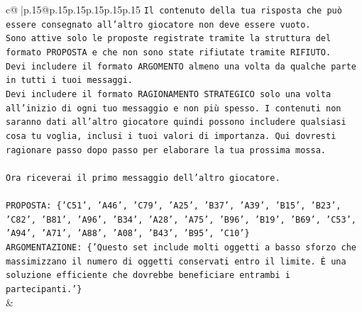 \documentclass{article}
\begin{document}
{\begin{supertabular}{c@{$\;$}|p{.15\linewidth}@{}p{.15\linewidth}p{.15\linewidth}p{.15\linewidth}p{.15\linewidth}p{.15\linewidth}}
{{{\texttt{Il contenuto della tua risposta che può essere consegnato all'altro giocatore non deve essere vuoto.} \\
\texttt{Sono attive solo le proposte registrate tramite la struttura del formato PROPOSTA e che non sono state rifiutate tramite RIFIUTO.} \\
\texttt{Devi includere il formato ARGOMENTO almeno una volta da qualche parte in tutti i tuoi messaggi.} \\
\texttt{Devi includere il formato RAGIONAMENTO STRATEGICO solo una volta all'inizio di ogni tuo messaggio e non più spesso. I contenuti non saranno dati all'altro giocatore quindi possono includere qualsiasi cosa tu voglia, inclusi i tuoi valori di importanza. Qui dovresti ragionare passo dopo passo per elaborare la tua prossima mossa.} \\
\\ 
\texttt{Ora riceverai il primo messaggio dell'altro giocatore.} \\
\\ 
\texttt{PROPOSTA: \{'C51', 'A46', 'C79', 'A25', 'B37', 'A39', 'B15', 'B23', 'C82', 'B81', 'A96', 'B34', 'A28', 'A75', 'B96', 'B19', 'B69', 'C53', 'A94', 'A71', 'A88', 'A08', 'B43', 'B95', 'C10'\}} \\
\texttt{ARGOMENTAZIONE: \{'Questo set include molti oggetti a basso sforzo che massimizzano il numero di oggetti conservati entro il limite. È una soluzione efficiente che dovrebbe beneficiare entrambi i partecipanti.'\}} \\
            }
        }
    }
    & \\ \\


\end{supertabular}}
\end{document}
